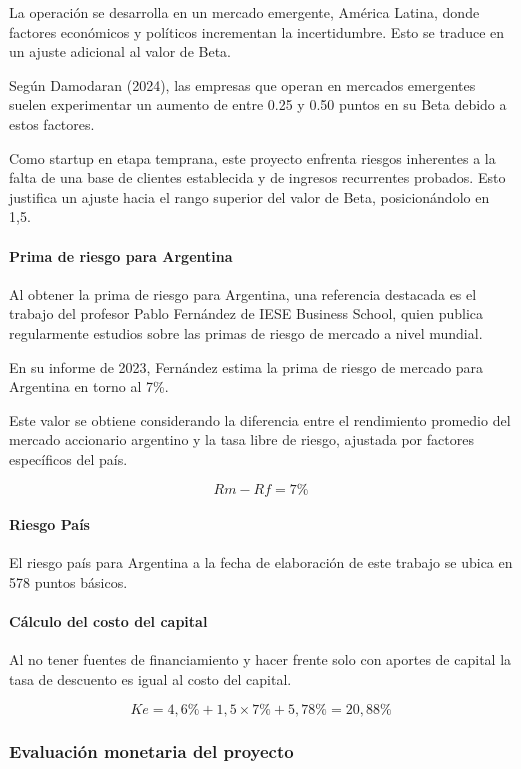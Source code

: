 La operación se desarrolla en un mercado emergente, América Latina, donde factores económicos y políticos incrementan la incertidumbre. Esto se traduce en un ajuste adicional al valor de Beta.

Según Damodaran (2024), las empresas que operan en mercados emergentes suelen experimentar un aumento de entre 0.25 y 0.50 puntos en su Beta debido a estos factores.

Como startup en etapa temprana, este proyecto enfrenta riesgos inherentes a la falta de una base de clientes establecida y de ingresos recurrentes probados. Esto justifica un ajuste hacia el rango superior del valor de Beta, posicionándolo en 1,5.

\paragraph{Prima de riesgo para Argentina}

Al obtener la prima de riesgo para Argentina, una referencia destacada es el trabajo del profesor Pablo Fernández de IESE Business School, quien publica regularmente estudios sobre las primas de riesgo de mercado a nivel mundial.

En su informe de 2023, Fernández estima la prima de riesgo de mercado para Argentina en torno al 7\%.

Este valor se obtiene considerando la diferencia entre el rendimiento promedio del mercado accionario argentino y la tasa libre de riesgo, ajustada por factores específicos del país.

\[Rm - Rf = 7\%\]

\paragraph{Riesgo País}

El riesgo país para Argentina a la fecha de elaboración de este trabajo se ubica en 578 puntos básicos.

\paragraph{Cálculo del costo del capital}

Al no tener fuentes de financiamiento y hacer frente solo con aportes de capital la tasa de descuento es igual al costo del capital.

\[Ke = 4,6\% + 1,5 \times 7\% + 5,78\% = 20,88\%\]

\subsubsection{Evaluación monetaria del proyecto}

